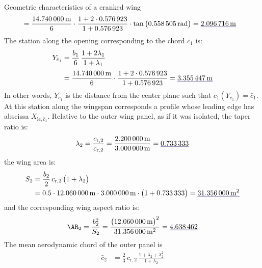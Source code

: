 \documentclass[[12pt,twoside]{book}
\begin{document}
\begin{myExampleX}{Geometric characteristics of a cranked wing}{}
\[\begin{split}
  & {}=
    \frac{\SI[round-precision=1]{\mySpanWingIMT}{\metre}}{6}
      \cdot 
      \frac{
        1 + 2\cdot\SI[round-precision=2]{\myTaperRatioWingI}{}
      }{
        1 + \SI[round-precision=2]{\myTaperRatioWingI}{}
      }
      \cdot \tan \big( \SI[round-precision=3]{\mySweepLEWingIRAD}{\radian} \big)
    = \mathunderline{mydarkblue}{ \SI[round-precision=2]{\myXMACLEToApexWingIMT}{\metre} }
\end{split}
\]
The station along the opening corresponding to the chord $\bar{c}_1$ is:
\[
\begin{split}
Y_{\bar{c}_1} 
  & {}=
    \frac{b_1}{6} \, \frac{1+2\lambda_1}{1+\lambda_1} \\[3pt]
  & {}=
    \frac{\SI[round-precision=1]{\mySpanWingIMT}{\metre}}{6}
      \cdot 
      \frac{
        1 + 2\cdot\SI[round-precision=2]{\myTaperRatioWingI}{}
      }{
        1 + \SI[round-precision=2]{\myTaperRatioWingI}{}
      }
    = \mathunderline{mydarkblue}{ \SI[round-precision=2]{\myYMACWingIMT}{\metre} }
\end{split}
\]
In other words, $Y_{\bar{c}_1}$ is the distance from the center plane such that
$c_1(Y_{\bar{c}_1})=\bar{c}_1$. At this station along the wingspan corresponds a profile whose leading edge has abscissa $X_{\mathrm{le},\bar{c}_1}$.
Relative to the outer wing panel, as if it was isolated, the taper ratio is:
\[
\lambda_2
  =\frac{c_{\mathrm{t},2}}{c_{\mathrm{r},2}}
  =\frac{\SI[round-precision=2]{\myChordTipWingIIMT}{\metre}}{\SI[round-precision=2]{\myChordRootWingIIMT}{\metre}}
  =\mathunderline{mydarkblue}{ \SI[round-precision=2]{\myTaperRatioWingII}{} }
\]
the wing area is:
\[
\begin{split}
S_2 & {}= \frac{b_2}{2} \, c_{\mathrm{r},2} \, \big( 1 + \lambda_2 \big) \\
  & {}=
    \num{0.5} \cdot \SI[round-precision=1]{\mySpanWingIIMT}{\metre}
      \cdot \SI[round-precision=2]{\myChordRootWingIIMT}{\metre}
      \cdot \big( 1 + \SI[round-precision=2]{\myTaperRatioWingII}{} \big) 
    = \mathunderline{mydarkblue}{ \SI[round-precision=1]{\myAreaWingIIMTsquared}{\metre^2} }
\end{split}
\]
and the corresponding wing aspect ratio is:
\[
\AR_2 
  = \frac{b_2^2}{S_2}
  = \frac{\big(\SI[round-precision=1]{\mySpanWingIIMT}{\metre}\big)^2}{\SI[round-precision=1]{\myAreaWingIIMTsquared}{\metre^2}}
  = \mathunderline{mydarkblue}{ \num[round-precision=2]{\myAspectRatioWingII} }
\]
%
The mean aerodynamic chord of the outer panel is
\[
\begin{split}
\bar{c}_2 & {}= \frac{2}{3} \, c_{\mathrm{r},2} \, \frac{1+\lambda_2 + \lambda_2^2}{1+\lambda_2} \\

\end{split}\]
\end{myExampleX}
\end{document}

